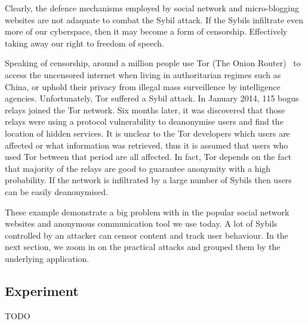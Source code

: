 Clearly, the defence mechanisms employed by social network and micro-blogging
websites are not adaquate to combat the Sybil attack. If the Sybils infiltrate
even more of our cyberspace, then it may become a form of censorship.
Effectively taking away our right to freedom of speech.

Speaking of censorship, around a million \cite{tormetric} people use Tor (The
Onion Router)~\cite{dingledine2004tor} to access the uncensored internet when
living in authoritarian regimes such as China, or uphold their privacy from
illegal mass surveillence by intelligence agencies. Unfortunately, Tor suffered
a Sybil attack. In January 2014, 115 bogus relays joined the Tor network. Six months
later, it was discovered that those relays were using a protocol vulnerability
to deanonymise users and find the location of hidden services. It is unclear to
the Tor developers which users are affected or what information was retrieved,
thus it is assumed that users who used Tor between that period are all
affected\cite{torsybil}. In fact, Tor depends on the fact that majority of the
relays are good to guarantee anonymity with a high probability. If the network
is infiltrated by a large number of Sybils then users can be easily
deanonymised.

These example demonstrate a big problem with in the popular social network
websites and anonymous communication tool we use today. A lot of Sybils
controlled by an attacker can censor content and track user behaviour. In the
next section, we zoom in on the practical attacks and grouped them by the
underlying application.

\subsection{Experiment}
TODO

